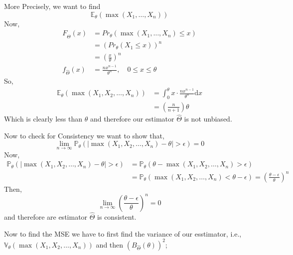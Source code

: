 \documentclass[12pt,a4paper]{article}
\begin{document}
   More Precisely, we want to find 
   \begin{equation*}
    \mathbb{E}_{\theta}(\max(X_{1},\ldots,X_{n}))
   \end{equation*}    
   Now,
   \begin{align*}
    F_{\hat{\Theta}}(x)&= Pr_{\theta}(\max(X_{1},\ldots,X_{n})\leq x) \\
    &= (Pr_{\theta}\left( X_{1}\leq x \right))^n \\
    &= \left( \frac{x}{\theta} \right)^n\\
    f_{\hat{\Theta}}(x)&= \frac{nx^{n-1}}{\theta^n},  \quad 0\leq x\leq \theta
   \end{align*}
   So,
   \begin{align*}
       \mathbb{E}_{\theta}\left( \max\left( X_{1},X_{2},\ldots,X_{n} \right)  \right)&= \int_{0}^{\theta} x\cdot \frac{n x^{n-1}}{\theta^n} \mathrm{d}x \\
       &= \left(\frac{n}{n+1}\right)\theta
   \end{align*}    
   Which is clearly less than \(\theta\) and therefore our estimator \( \hat{\Theta}\) is not unbiased.  
   
   Now to check for Consistency we want to show that,
   \begin{equation*}
       \lim_{n\to \infty} \mathbb{P}_{\theta}\left( |\max\left( X_{1},X_{2},\ldots,X_{n} \right) - \theta | > \epsilon \right) =0
   \end{equation*} 
   Now, 
   \begin{align*}
    \mathbb{P}_{\theta}\left( |\max\left( X_{1},X_{2},\ldots,X_{n} \right) - \theta | > \epsilon \right)&= \mathbb{P}_{\theta}\left( \theta - \max\left( X_{1},X_{2},\ldots,X_{n} \right)>\epsilon  \right)\\
    &=\mathbb{P}_{\theta}\left( \max\left( X_{1},X_{2},\ldots,X_{n} \right) < \theta - \epsilon  \right) = \left(\frac{\theta - \epsilon}{\theta}\right)^n
   \end{align*}
   Then,
   \begin{equation*}
    \lim_{n\to \infty}\left(\frac{\theta - \epsilon}{\theta}\right)^n=0 
   \end{equation*}
   and therefore are estimator \(\hat{\Theta}\) is consistent.
   
   
   Now to find the MSE we have to first find the variance of our esstimator, i.e., \(\mathbb{V}_{\theta}(\max\left( X_{1},X_{2},\ldots,X_{n} \right))\) and then \(\left( B_{\hat{\Theta}}(\theta) \right)^2 \);
   
\end{document}
